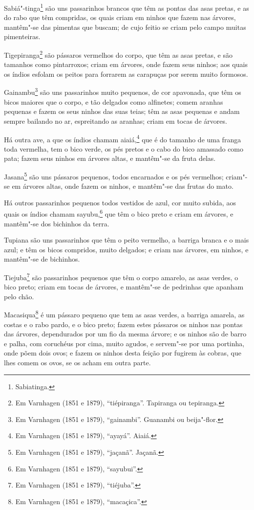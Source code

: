 Sabiá"-tinga\footnote{ Sabiatinga.} são uns passarinhos brancos que têm as pontas das asas
pretas, e as do rabo que têm compridas, os quais criam em ninhos que fazem nas árvores,
mantêm"-se das pimentas que buscam; de cujo feitio se criam pelo campo muitas pimenteiras.

Tigepiranga\footnote{ Em Varnhagen (1851 e 1879), ``tiépiranga''. Tapiranga ou tepiranga.}
são pássaros vermelhos do corpo, que têm as asas pretas, e são tamanhos como pintarroxos;
criam em árvores, onde fazem seus ninhos; aos quais os índios esfolam os peitos para
forrarem as carapuças por serem muito formosos.

Gainambu\footnote{ Em Varnhagen (1851 e 1879), ``gainambi''. Guanambi ou beija"-flor.} são
uns passarinhos muito pequenos, de cor apavonada, que têm os bicos maiores que o corpo, e
tão delgados como alfinetes; comem aranhas pequenas e fazem os seus ninhos das suas teias;
têm as asas pequenas e andam sempre bailando no ar, espreitando as aranhas; criam em tocas
de árvores.

Há outra ave, a que os índios chamam aiaiá,\footnote{ Em Varnhagen (1851 e 1879),
``ayayá''. Aiaiá.} que é do tamanho de uma franga toda vermelha, tem o bico verde, os pés
pretos e o cabo do bico amassado como pata; fazem seus ninhos em árvores altas, e 
mantêm"-se da fruta delas.

Jasana\footnote{ Em Varnhagen (1851 e 1879), ``jaçanã''. Jaçanã.} são uns pássaros
pequenos, todos encarnados e os pés vermelhos; criam"-se em árvores altas, onde fazem os
ninhos, e mantêm"-se das frutas do mato.

Há outros passarinhos pequenos todos vestidos de azul, cor muito subida, aos quais os
índios chamam sayubu,\footnote{ Em Varnhagen (1851 e 1879), ``sayubui''.} que têm o bico
preto e criam em árvores, e mantêm"-se dos bichinhos da terra.

Tupiana são uns passarinhos que têm o peito vermelho, a barriga branca e o mais azul; e
têm os bicos compridos, muito delgados; e criam nas árvores, em ninhos, e mantêm"-se de
bichinhos.

Tiejuba\footnote{ Em Varnhagen (1851 e 1879), ``tiéjuba''.} são passarinhos pequenos que
têm o corpo amarelo, as asas verdes, o bico preto; criam em tocas de árvores, e mantêm"-se
de pedrinhas que apanham pelo chão.

Macasiqua\footnote{ Em Varnhagen (1851 e 1879), ``macaçica''.} é um pássaro pequeno que
tem as asas verdes, a barriga amarela, as costas e o rabo pardo, e o bico preto; fazem
estes pássaros os ninhos nas pontas das árvores, dependurados por um fio da mesma árvore;
e os ninhos são de barro e palha, com coruchéus por cima, muito agudos, e servem"-se por
uma portinha, onde põem dois ovos; e fazem os ninhos desta feição por fugirem às cobras,
que lhes comem os ovos, se os acham em outra parte.

